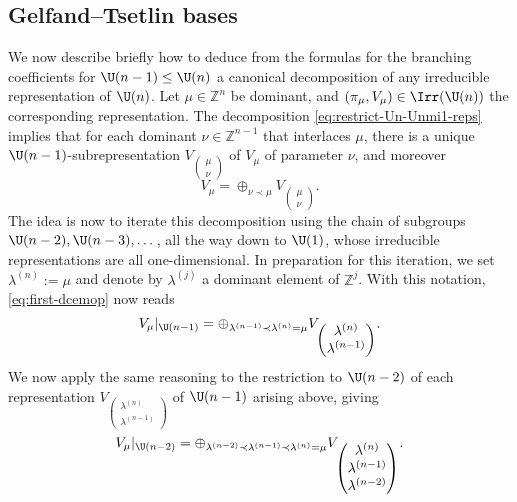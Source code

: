 \documentclass[reqno]{amsart} 
\begin{document}
\subsection{Gelfand--Tsetlin bases}\label{sec:cnh2vooaw4}
We now describe briefly how to deduce from the formulas for the branching coefficients for $\U(n-1) \leq \U(n)$ a canonical decomposition of any irreducible representation of $\U(n)$.  Let $\mu \in \mathbb{Z}^n$ be dominant, and $(\pi_\mu,V_\mu) \in \Irr(\U(n))$ the corresponding representation.  The decomposition \eqref{eq:restrict-Un-Unmi1-reps} implies that for each dominant $\nu \in \mathbb{Z}^{n-1}$ that interlaces $\mu$, there is a unique $\U(n-1)$-subrepresentation $V _{
\begin{pmatrix}
    \mu   \\
    \nu
  \end{pmatrix}
}$ of $V_{\mu}$ of parameter $\nu$, and moreover
\begin{equation}\label{eq:first-dcemop}
  V_\mu = \oplus_{\nu \prec \mu} V _{
\begin{pmatrix}
      \mu   \\
      \nu 
    \end{pmatrix}
}.
\end{equation}
The idea is now to iterate this decomposition using the chain of subgroups $\U(n-2), \U(n-3), \dotsc$, all the way down to $\U(1)$, whose irreducible representations are all one-dimensional.  In preparation for this iteration, we set $\lambda^{(n)} := \mu$ and denote by $\lambda^{(j)}$ a dominant element of $\mathbb{Z}^{j}$.  With this notation, \eqref{eq:first-dcemop} now reads
\begin{equation*}
  V_\mu |_{\U(n-1)}
  =
  \oplus_{\lambda^{(n-1)} \prec \lambda^{(n)} = \mu }
  V _{
    \begin{pmatrix}
      \lambda^{(n)}  \\
      \lambda^{(n-1)}
    \end{pmatrix}
  }.
\end{equation*}
We now apply the same reasoning to the restriction to $\U(n-2)$ of each representation $V _{
\begin{pmatrix}
    \lambda^{(n)}  \\
    \lambda^{(n-1)}
  \end{pmatrix}
}$ of $\U(n-1)$ arising above, giving
\begin{equation*}
  V_\mu |_{\U(n-2)}
  =
  \oplus_{\lambda^{(n-2)} \prec \lambda^{(n-1)} \prec \lambda^{(n)} = \mu }
  V _{
    \begin{pmatrix}
      \lambda^{(n)}  \\
      \lambda^{(n-1)} \\
      \lambda^{(n-2)}
    \end{pmatrix}
  }.
\end{equation*}
\end{document}
